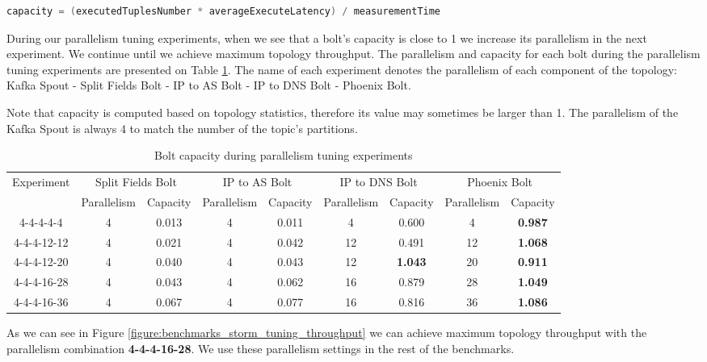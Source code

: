 \begin{lstlisting}[language=C]
capacity = (executedTuplesNumber * averageExecuteLatency) / measurementTime
\end{lstlisting}

During our parallelism tuning experiments, when we see that a bolt's capacity is close to 1 we increase its parallelism in the next experiment. We continue until we achieve maximum topology throughput. The parallelism and capacity for each bolt during the parallelism tuning experiments are presented on Table \ref{table:parallelism_tuning}. The name of each experiment denotes the parallelism of each component of the topology: Kafka Spout - Split Fields Bolt - IP to AS Bolt - IP to DNS Bolt - Phoenix Bolt.

Note that capacity is computed based on topology statistics, therefore its value may sometimes be larger than 1. The parallelism of the Kafka Spout is always 4 to match the number of the topic's partitions.

\begin{table}[H]
\centering
\resizebox{1\textwidth}{!} {
\begin{tabular}{ |*{9}{c|} }
\hline
\multirow{2}{*}{Experiment} & \multicolumn{2}{|c|}{Split Fields Bolt} & \multicolumn{2}{|c|}{IP to AS Bolt} & \multicolumn{2}{|c|}{IP to DNS Bolt} & \multicolumn{2}{|c|}{Phoenix Bolt} \\ \cline{2-9}
 & Parallelism & Capacity & Parallelism & Capacity & Parallelism & Capacity & Parallelism & Capacity \\ \hline \hline
4-4-4-4-4 & 4 & 0.013 & 4 & 0.011 & 4 & 0.600 & 4 & \textbf{0.987} \\ \hline
4-4-4-12-12 & 4 & 0.021 & 4 & 0.042 & 12 & 0.491 & 12 & \textbf{1.068} \\ \hline
4-4-4-12-20 & 4 & 0.040 & 4 & 0.043 & 12 & \textbf{1.043} & 20 & \textbf{0.911} \\ \hline
4-4-4-16-28 & 4 & 0.043 & 4 & 0.062 & 16 & 0.879 & 28 & \textbf{1.049} \\ \hline
4-4-4-16-36 & 4 & 0.067 & 4 & 0.077 & 16 & 0.816 & 36 & \textbf{1.086} \\ \hline
\end{tabular}
}
\caption{Bolt capacity during parallelism tuning experiments}
\label{table:parallelism_tuning}
\end{table}

As we can see in Figure \ref{figure:benchmarks_storm_tuning_throughput} we can achieve maximum topology throughput with the parallelism combination \textbf{4-4-4-16-28}. We use these parallelism settings in the rest of the benchmarks.

